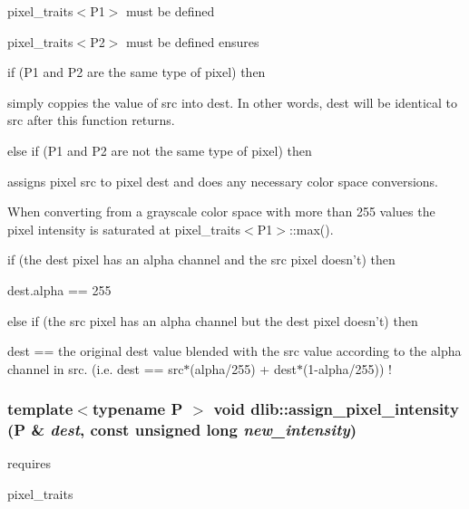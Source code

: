 \begin{DoxyItemize}
\item pixel\_\-traits$<$P1$>$ must be defined
\item pixel\_\-traits$<$P2$>$ must be defined ensures
\item if (P1 and P2 are the same type of pixel) then
\begin{DoxyItemize}
\item simply coppies the value of src into dest. In other words, dest will be identical to src after this function returns.
\end{DoxyItemize}
\item else if (P1 and P2 are not the same type of pixel) then
\begin{DoxyItemize}
\item assigns pixel src to pixel dest and does any necessary color space conversions.
\item When converting from a grayscale color space with more than 255 values the pixel intensity is saturated at pixel\_\-traits$<$P1$>$::max().
\item if (the dest pixel has an alpha channel and the src pixel doesn't) then
\begin{DoxyItemize}
\item dest.alpha == 255
\end{DoxyItemize}
\item else if (the src pixel has an alpha channel but the dest pixel doesn't) then
\begin{DoxyItemize}
\item dest == the original dest value blended with the src value according to the alpha channel in src. (i.e. dest == src$\ast$(alpha/255) + dest$\ast$(1-\/alpha/255)) ! 
\end{DoxyItemize}
\end{DoxyItemize}
\end{DoxyItemize}\hypertarget{namespacedlib_a3b9a3281788e2c68adbe5e81265aaeb2}{
\subsubsection[{assign\_\-pixel\_\-intensity}]{\setlength{\rightskip}{0pt plus 5cm}template$<$typename P $>$ void dlib::assign\_\-pixel\_\-intensity (P \& {\em dest}, \/  const unsigned long {\em new\_\-intensity})}}
\label{namespacedlib_a3b9a3281788e2c68adbe5e81265aaeb2}
requires
\begin{DoxyItemize}
\item pixel\_\-traits
\end{DoxyItemize}

